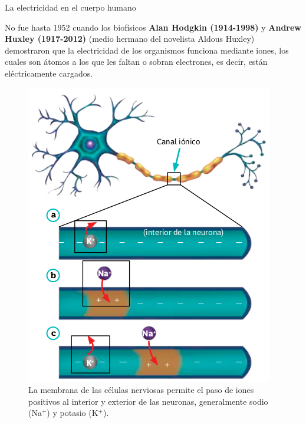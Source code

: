 \begin{sectionbox}{La electricidad en el cuerpo humano}
\begin{minipage}{0.55\textwidth}
        No fue hasta 1952 cuando los biofísicos \textbf{Alan
        Hodgkin (1914-1998)} y \textbf{Andrew Huxley (1917-2012)}
        (medio hermano del novelista Aldous Huxley) demostraron que la electricidad de los organismos funciona mediante iones, los cuales
        son átomos a los que les faltan o sobran electrones, es
        decir, están eléctricamente cargados.

    \end{minipage}\hfill
    \begin{minipage}{0.42\textwidth}
        \begin{figure}[H]
            \centering
            \includegraphics[width=0.95\linewidth]{../images/20230502034142}
            \caption{La membrana de las células nerviosas permite el
                paso de iones positivos al interior y exterior de las neuronas,
                generalmente sodio (Na$^+$) y potasio (K$^+$).}
            \label{fig:20230502034142}
        \end{figure}
    \end{minipage}


\end{sectionbox}
